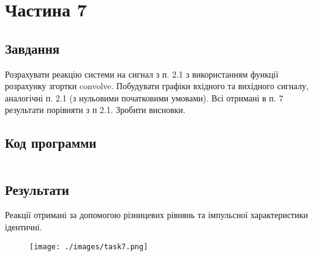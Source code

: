 \section{Частина 7}
\label{sec:task7}

\subsection{Завдання}
\label{subsec:task7_task}

Розрахувати реакцію системи на сигнал з п. 2.1 з використанням
функції розрахунку згортки convolve. Побудувати графіки вхідного та
вихідного сигналу, аналогічні п. 2.1 (з нульовими початковими умовами).
Всі отримані в п. 7 результати порівняти з п 2.1. Зробити висновки.

\subsection{Код программи}
\label{subsec:task7_code}
\inputminted{python}{../src/task7.py}

\subsection{Результати}
\label{subsec:task7_results}

Реакції отримані за допомогою різницевих рівнянь
та імпульсної характеристики ідентичні.

\begin{figure}[!ht]
    \centering
    \texttt{[image: ./images/task7.png]}
\end{figure}
